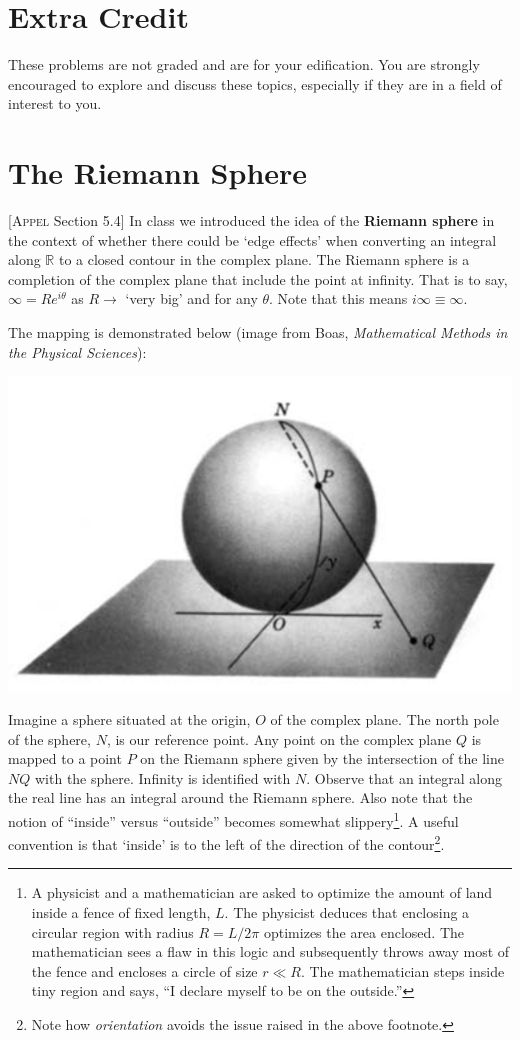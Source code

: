 \documentclass[12pt]{article}
\numberwithin{equation}{section}    %
\begin{document}
\appendix
\section*{\Large Extra Credit}


These problems are not graded and are for your edification. You are strongly encouraged to explore and discuss these topics, especially if they are in a field of interest to you.

\section{The Riemann Sphere}


[\textsc{Appel} Section 5.4]
%
In class we introduced the idea of the \textbf{Riemann sphere} in the context of whether there could be `edge effects' when converting an integral along $\mathbb{R}$ to a closed contour in the complex plane.
The Riemann sphere is a completion of the complex plane that include the point at infinity. That is to say, $\infty = R e^{i\theta}$ as $R\to$ `very big' and for any $\theta$. Note that this means $i\infty \equiv \infty$. 

The mapping is demonstrated below (image from Boas, \emph{Mathematical Methods in the Physical Sciences}):

\begin{center}
\includegraphics[width=.5\textwidth]{Boas_RiemannSphere}	
\end{center}

Imagine a sphere situated at the origin, $O$ of the complex plane. The north pole of the sphere, $N$, is our reference point. Any point on the complex plane $Q$ is mapped to a point $P$ on the Riemann sphere given by the intersection of the line $NQ$ with the sphere. Infinity is identified with $N$. Observe that an integral along the real line has an integral around the Riemann sphere. Also note that the notion of ``inside'' versus ``outside'' becomes somewhat slippery\footnote{A physicist and a mathematician are asked to optimize the amount of land inside a fence of fixed length, $L$. The physicist deduces that enclosing a circular region with radius $R = L/2\pi$ optimizes the area enclosed. The mathematician sees a flaw in this logic and subsequently throws away most of the fence and encloses a circle of size $r \ll R$. The mathematician steps inside tiny region and says, ``I declare myself to be on the outside.'' }. A useful convention is that `inside' is to the left of the direction of the contour\footnote{Note how \emph{orientation} avoids the issue raised in the above footnote.}. 
\end{document}
